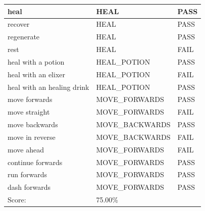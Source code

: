 \documentclass[11pt]{article}
\begin{document}
\begin{table}[H]
\begin{tabular}{lll}
\multicolumn{1}{l|}{heal}                           & \multicolumn{1}{l|}{HEAL}               & \cellcolor[HTML]{67FD9A}PASS \\ \hline
\multicolumn{1}{l|}{recover}                        & \multicolumn{1}{l|}{HEAL}               & \cellcolor[HTML]{67FD9A}PASS \\ \hline
\multicolumn{1}{l|}{regenerate}                     & \multicolumn{1}{l|}{HEAL}               & \cellcolor[HTML]{67FD9A}PASS \\ \hline
\multicolumn{1}{l|}{rest}                           & \multicolumn{1}{l|}{HEAL}               & \cellcolor[HTML]{FD6864}FAIL \\ \hline
\multicolumn{1}{l|}{heal with a potion}             & \multicolumn{1}{l|}{HEAL\_POTION}       & \cellcolor[HTML]{67FD9A}PASS \\ \hline
\multicolumn{1}{l|}{heal with an elixer}            & \multicolumn{1}{l|}{HEAL\_POTION}       & \cellcolor[HTML]{FD6864}FAIL \\ \hline
\multicolumn{1}{l|}{heal with an healing drink}     & \multicolumn{1}{l|}{HEAL\_POTION}       & \cellcolor[HTML]{67FD9A}PASS \\ \hline
\multicolumn{1}{l|}{move forwards}                  & \multicolumn{1}{l|}{MOVE\_FORWARDS}     & \cellcolor[HTML]{67FD9A}PASS \\ \hline
\multicolumn{1}{l|}{move straight}                  & \multicolumn{1}{l|}{MOVE\_FORWARDS}     & \cellcolor[HTML]{FD6864}FAIL \\ \hline
\multicolumn{1}{l|}{move backwards}                 & \multicolumn{1}{l|}{MOVE\_BACKWARDS}    & \cellcolor[HTML]{67FD9A}PASS \\ \hline
\multicolumn{1}{l|}{move in reverse}                & \multicolumn{1}{l|}{MOVE\_BACKWARDS}    & \cellcolor[HTML]{FD6864}FAIL \\ \hline
\multicolumn{1}{l|}{move ahead}                     & \multicolumn{1}{l|}{MOVE\_FORWARDS}     & \cellcolor[HTML]{FD6864}FAIL \\ \hline
\multicolumn{1}{l|}{continue forwards}              & \multicolumn{1}{l|}{MOVE\_FORWARDS}     & \cellcolor[HTML]{67FD9A}PASS \\ \hline
\multicolumn{1}{l|}{run forwards}                   & \multicolumn{1}{l|}{MOVE\_FORWARDS}     & \cellcolor[HTML]{67FD9A}PASS \\ \hline
\multicolumn{1}{l|}{dash forwards}                  & \multicolumn{1}{l|}{MOVE\_FORWARDS}     & \cellcolor[HTML]{67FD9A}PASS \\ \hline
\multicolumn{1}{l|}{Score:}                         & \multicolumn{1}{l|}{75.00\%}            &                              \\
\end{tabular}
\end{table}
\end{document}

